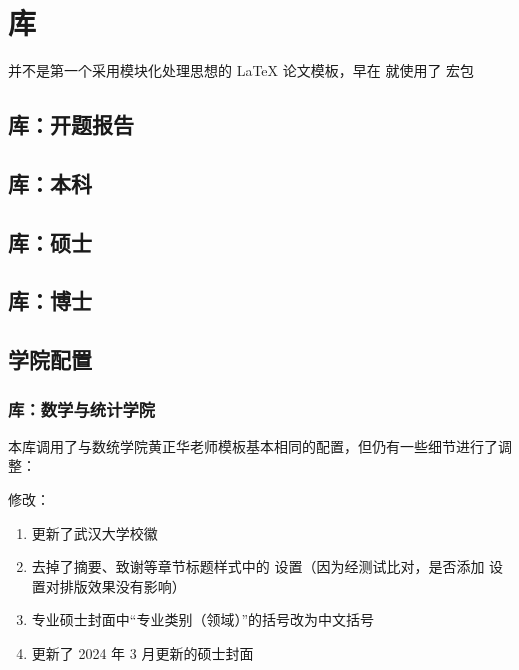 
\chapter{库}

 并不是第一个采用模块化处理思想的 \LaTeX{} 论文模板，早在  就使用了  宏包

\section{ 库：开题报告}


\section{ 库：本科}


\section{ 库：硕士}


\section{ 库：博士}


\section{学院配置}

\subsection{ 库：数学与统计学院}

本库调用了与数统学院黄正华老师模板基本相同的配置，但仍有一些细节进行了调整：

修改：
\begin{enumerate}
  \item 更新了武汉大学校徽\cite{whulogo}
  \item 去掉了摘要、致谢等章节标题样式中的  设置（因为经测试比对，是否添加  设置对排版效果没有影响）
  \item 专业硕士封面中“专业类别（领域）”的括号改为中文括号
  \item 更新了 2024 年 3 月更新的硕士封面\cite{武汉大学硕士学位论文印制规定}
\end{enumerate}

